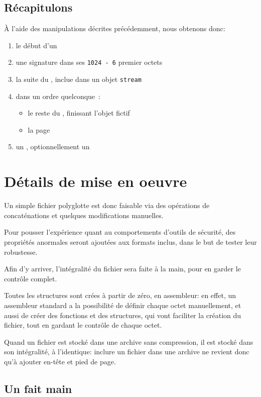 \subsection{Récapitulons}

À l'aide des manipulations décrites précédemment, nous obtenons donc:
\begin{enumerate}
\item le début d'un \PE
\item une signature \PDF dans ses \texttt{1024 - 6} premier octets
\item la suite du \PE, inclue dans un objet \texttt{stream} \PDF
\item dans un ordre quelconque~:
\begin{itemize}
\item le reste du \PDF, finissant l'objet fictif
\item la page \HTML
\end{itemize}
\item un \ZIP, optionnellement un \JAR
\end{enumerate}

\section{Détails de mise en oeuvre}

Un simple fichier polyglotte est donc faisable via des opérations de concaténations et quelques modifications manuelles.

Pour pousser l'expérience quant au comportements d'outils de sécurité, des propriétés anormales seront ajoutées aux formats inclus, dans le but de tester leur robustesse.

Afin d'y arriver, l'intégralité du fichier sera faite à la main, pour en garder le contrôle complet.

Toutes les structures sont crées à partir de zéro, en assembleur: en effet, un assembleur standard a la possibilité de définir chaque octet manuellement, et aussi de créer des fonctions et des structures, qui vont faciliter la création du fichier, tout en gardant le contrôle de chaque octet.

Quand un fichier est stocké dans une archive \ZIP sans compression, il est stocké dans son intégralité, à l'identique: inclure un fichier dans une archive ne revient donc qu'à ajouter en-tête et pied de page.

\subsection{Un \PE fait main}

